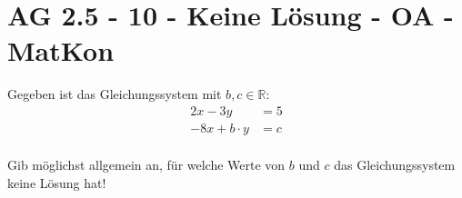 \section{AG 2.5 - 10 - Keine Lösung - OA - MatKon}

\begin{beispiel}[AG 2.5]{1}
Gegeben ist das Gleichungssystem mit $b,c\in\mathbb{R}$:
\begin{align*}
2x-3y &= 5\\
-8x+b\cdot y&= c\\
\end{align*}

Gib möglichst allgemein an, für welche Werte von $b$ und $c$ das Gleichungssystem keine Lösung hat!

\end{beispiel}